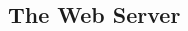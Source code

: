 \documentclass{article}
\begin{document}
\begin{CJK*}{UTF8}{gkai}
\subsection{The Web Server}

\begin{lstlisting}[style=ccode, title={\scriptsize \ttfamily \bfseries : ()}]
\end{lstlisting}

\begin{lstlisting}[style=ccode, title={\scriptsize \ttfamily \bfseries : ()}]
\end{lstlisting}

\begin{lstlisting}[style=ccode, title={\scriptsize \ttfamily \bfseries : ()}]
\end{lstlisting}

\begin{lstlisting}[style=exercise]
\end{lstlisting}

\clearpage

\end{CJK*}
\end{document}
